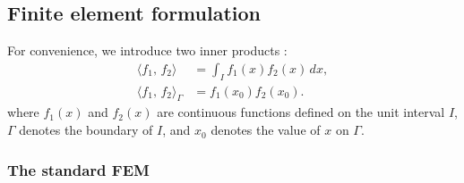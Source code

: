 \documentclass[review,3p]{elsarticle}
\begin{document}
\subsection{Finite element formulation} 	\label{FE formulation}

For convenience, we introduce two inner products \citep{lipschutz2009linear}:
 \begin{subequations}
  \begin{align}
	\langle f_1, \,f_2 \rangle &= \int _I f_1(x) f_2(x) \, dx,	\\
   \langle f_1, \,f_2 \rangle _{\Gamma} &= f_1(x_0) f_2(x_0).
  \end{align}
 \end{subequations}
where $f_1(x)$ and $f_2(x)$ are continuous functions defined on the unit interval $I$, $\Gamma$ denotes the boundary of $I$, and $x_0$ denotes the value of $x$ on $\Gamma$.

\subsubsection{The standard FEM}
\end{document}

